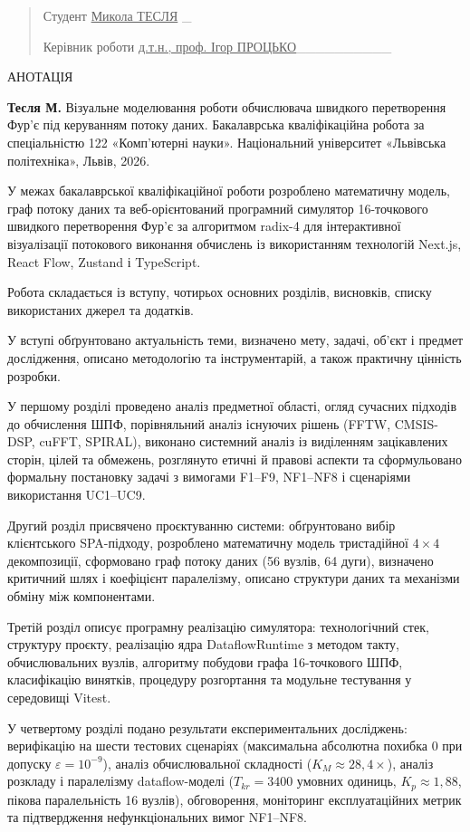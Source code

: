 \documentclass[
]{article}
\begin{document}
\begin{quote}
Студент \ul{Микола ТЕСЛЯ} \_

Керівник роботи \ul{д.т.н., проф. Ігор ПРОЦЬКО}\_\_\_\_\_\_\_\_\_\_
\end{quote}

АНОТАЦІЯ

\textbf{Тесля М.} Візуальне моделювання роботи обчислювача швидкого
перетворення Фур'є під керуванням потоку даних. Бакалаврська
кваліфікаційна робота за спеціальністю 122 «Комп'ютерні науки».
Національний університет «Львівська політехніка», Львів, 2026.

У межах бакалаврської кваліфікаційної роботи розроблено математичну
модель, граф потоку даних та веб-орієнтований програмний симулятор
16-точкового швидкого перетворення Фур'є за алгоритмом radix-4 для
інтерактивної візуалізації потокового виконання обчислень із
використанням технологій Next.js, React Flow, Zustand і TypeScript.

Робота складається із вступу, чотирьох основних розділів, висновків,
списку використаних джерел та додатків.

У вступі обґрунтовано актуальність теми, визначено мету, задачі, об'єкт
і предмет дослідження, описано методологію та інструментарій, а також
практичну цінність розробки.

У першому розділі проведено аналіз предметної області, огляд сучасних
підходів до обчислення ШПФ, порівняльний аналіз існуючих рішень (FFTW,
CMSIS-DSP, cuFFT, SPIRAL), виконано системний аналіз із виділенням
зацікавлених сторін, цілей та обмежень, розглянуто етичні й правові
аспекти та сформульовано формальну постановку задачі з вимогами F1--F9,
NF1--NF8 і сценаріями використання UC1--UC9.

Другий розділ присвячено проєктуванню системи: обґрунтовано вибір
клієнтського SPA-підходу, розроблено математичну модель тристадійної
\(4 \times 4\) декомпозиції, сформовано граф потоку даних (56 вузлів, 64
дуги), визначено критичний шлях і коефіцієнт паралелізму, описано
структури даних та механізми обміну між компонентами.

Третій розділ описує програмну реалізацію симулятора: технологічний
стек, структуру проєкту, реалізацію ядра DataflowRuntime з методом
такту, обчислювальних вузлів, алгоритму побудови графа 16-точкового ШПФ,
класифікацію винятків, процедуру розгортання та модульне тестування у
середовищі Vitest.

У четвертому розділі подано результати експериментальних досліджень:
верифікацію на шести тестових сценаріях (максимальна абсолютна похибка
\(0\) при допуску \(\varepsilon = 10^{- 9}\)), аналіз обчислювальної
складності (\(K_{M} \approx 28,4 \times\)), аналіз розкладу і
паралелізму dataflow-моделі (\(T_{kr} = 3400\) умовних одиниць,
\(K_{p} \approx 1,88\), пікова паралельність 16 вузлів), обговорення,
моніторинг експлуатаційних метрик та підтвердження нефункціональних
вимог NF1--NF8.
\end{document}
